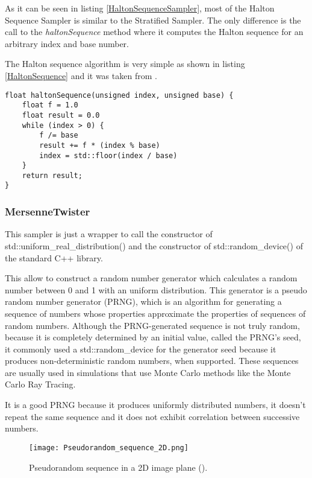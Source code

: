\par
As it can be seen in listing \ref{HaltonSequenceSampler}, most of the Halton Sequence Sampler is similar to the Stratified Sampler.
The only difference is the call to the \textit{haltonSequence} method where it computes the Halton sequence for an arbitrary index and base number.

\par
The Halton sequence algorithm is very simple as shown in listing \ref{HaltonSequence} and it was taken from \cite{HaltonSequence}.

\begin{lstlisting}[caption={Developed method of HaltonSequence}, captionpos=b, label=HaltonSequence]
float haltonSequence(unsigned index, unsigned base) {
	float f = 1.0
	float result = 0.0
	while (index > 0) {
		f /= base
		result += f * (index % base)
		index = std::floor(index / base)
	}
	return result;
}
\end{lstlisting}

\subsubsection{MersenneTwister}

\par
This sampler is just a wrapper to call the constructor of std::uniform\_real\_distribution() and the constructor of std::random\_device() of the standard C++ library.

This allow to construct a random number generator which calculates a random number between 0 and 1 with an uniform distribution.
This generator is a pseudo random number generator (PRNG), which is an algorithm for generating a sequence of numbers whose properties approximate the properties of sequences of random numbers.
Although the PRNG-generated sequence is not truly random, because it is completely determined by an initial value, called the PRNG's seed, it commonly used a std::random\_device for the generator seed because it produces non-deterministic random numbers, when supported.
These sequences are usually used in simulations that use Monte Carlo methods like the Monte Carlo Ray Tracing.

\par
It is a good PRNG because it produces uniformly distributed numbers, it doesn't repeat the same sequence and it does not exhibit correlation between successive numbers.

\begin{figure}[H]
	\centering
	\caption{Pseudorandom sequence in a 2D image plane (\cite{HaltonSequence}).}
	\label{Pseudorandom_sequence_2D.}
	\texttt{[image: Pseudorandom\_sequence\_2D.png]}
\end{figure}

